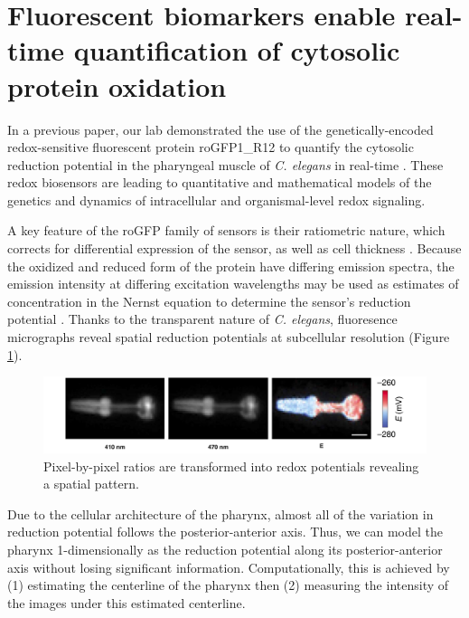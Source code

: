 \section{Fluorescent biomarkers enable real-time quantification of cytosolic protein oxidation} \label{fluorescenceIntro}
In a previous paper, our lab demonstrated the use of the genetically-encoded redox-sensitive fluorescent protein roGFP1\_R12 to quantify the cytosolic reduction potential in the pharyngeal muscle of \textit{C. elegans} in real-time \cite{cata2014}. These redox biosensors are leading to quantitative and mathematical models of the genetics and dynamics of intracellular and organismal-level redox signaling.

A key feature of the roGFP family of sensors is their ratiometric nature, which corrects for differential expression of the sensor, as well as cell thickness \cite{hanson2004}. Because the oxidized and reduced form of the protein have differing emission spectra, the emission intensity at differing excitation wavelengths may be used as estimates of concentration in the Nernst equation to determine the sensor's reduction potential \cite{meyer2010}. Thanks to the transparent nature of \textit{C. elegans}, fluoresence micrographs reveal spatial reduction potentials at subcellular resolution (Figure \ref{fig:ratioImageToE}).

\begin{figure}[ht]
    \centering
    \includegraphics[scale=.25]{Figures/rendered_files/ratios_to_e}
    \decoRule
    \caption[Ratios of images to reduction potential]{Pixel-by-pixel ratios are transformed into redox potentials revealing a spatial pattern.}
    \label{fig:ratioImageToE}
\end{figure}

Due to the cellular architecture of the pharynx, almost all of the variation in reduction potential follows the posterior-anterior axis. Thus, we can model the pharynx 1-dimensionally as the reduction potential along its posterior-anterior axis without losing significant information. Computationally, this is achieved by (1) estimating the centerline of the pharynx then (2) measuring the intensity of the images under this estimated centerline.

